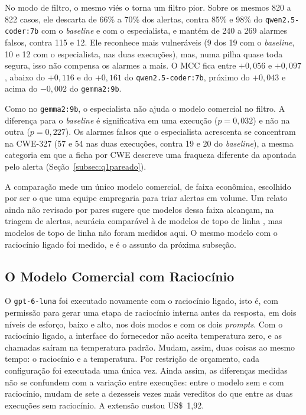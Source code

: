 No modo de filtro, o mesmo viés o torna um filtro pior. Sobre os mesmos 820 a 822 casos, ele descarta de 66\% a 70\% dos alertas, contra 85\% e 98\% do \texttt{qwen2.5-coder:7b} com o \textit{baseline} e com o especialista, e mantém de 240 a 269 alarmes falsos, contra 115 e 12. Ele reconhece mais vulneráveis (9 dos 19 com o \textit{baseline}, 10 e 12 com o especialista, nas duas execuções), mas, numa pilha quase toda segura, isso não compensa os alarmes a mais. O MCC fica entre $+0{,}056$ e $+0{,}097$, abaixo do $+0{,}116$ e do $+0{,}161$ do \texttt{qwen2.5-coder:7b}, próximo do $+0{,}043$ e acima do $-0{,}002$ do \texttt{gemma2:9b}.

Como no \texttt{gemma2:9b}, o especialista não ajuda o modelo comercial no filtro. A diferença para o \textit{baseline} é significativa em uma execução ($p = 0{,}032$) e não na outra ($p = 0{,}227$). Os alarmes falsos que o especialista acrescenta se concentram na CWE-327 (57 e 54 nas duas execuções, contra 19 e 20 do \textit{baseline}), a mesma categoria em que a ficha por CWE descreve uma fraqueza diferente da apontada pelo alerta (Seção~\ref{subsec:q1pareado}).

A comparação mede um único modelo comercial, de faixa econômica, escolhido por ser o que uma equipe empregaria para triar alertas em volume. Um relato ainda não revisado por pares sugere que modelos dessa faixa alcançam, na triagem de alertas, acurácia comparável à de modelos de topo de linha \cite{alatasi2026aisast}, mas modelos de topo de linha não foram medidos aqui. O mesmo modelo com o raciocínio ligado foi medido, e é o assunto da próxima subseção.

\subsection{O Modelo Comercial com Raciocínio}
\label{subsec:raciocinio}

O \texttt{gpt-6-luna} foi executado novamente com o raciocínio ligado, isto é, com permissão para gerar uma etapa de raciocínio interna antes da resposta, em dois níveis de esforço, baixo e alto, nos dois modos e com os dois \textit{prompts}. Com o raciocínio ligado, a interface do fornecedor não aceita temperatura zero, e as chamadas saíram na temperatura padrão. Mudam, assim, duas coisas ao mesmo tempo: o raciocínio e a temperatura. Por restrição de orçamento, cada configuração foi executada uma única vez. Ainda assim, as diferenças medidas não se confundem com a variação entre execuções: entre o modelo sem e com raciocínio, mudam de sete a dezesseis vezes mais vereditos do que entre as duas execuções sem raciocínio. A extensão custou US\$~1,92.

